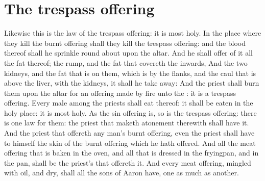\section*{The trespass offering}
\begin{biblechapter} %
\verse Likewise this is the law of the trespass offering: it is most holy.
\verse In the place where they kill the burnt offering shall they kill the trespass offering: and the blood thereof shall he sprinkle round about upon the altar.
\verse And he shall offer of it all the fat thereof; the rump, and the fat that covereth the inwards,
\verse And the two kidneys, and the fat that is on them, which is by the flanks, and the caul that is above the liver, with the kidneys, it shall he take away:
\verse And the priest shall burn them upon the altar for an offering made by fire unto the \LORD: it is a trespass offering.
\verse Every male among the priests shall eat thereof: it shall be eaten in the holy place: it is most holy.
\verse As the sin offering is, so is the trespass offering: there is one law for them: the priest that maketh atonement therewith shall have it.
\verse And the priest that offereth any man's burnt offering, even the priest shall have to himself the skin of the burnt offering which he hath offered.
\verse And all the meat offering that is baken in the oven, and all that is dressed in the fryingpan, and in the pan, shall be the priest's that offereth it.
\verse And every meat offering, mingled with oil, and dry, shall all the sons of Aaron have, one as much as another.

\end{biblechapter}
